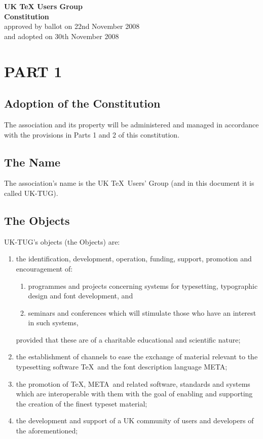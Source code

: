 \documentclass[a4paper,11pt]{article}
\newcommand{\MF}{{\manual META}\-{\manual FONT}}
\begin{document}
\begin{center}
\textbf{\Large{UK {\TeX} Users Group}} \\[3ex]
\textbf{Constitution} \\[2ex]
approved by ballot on 22nd November 2008 \\
and adopted on 30th November 2008
\end{center}
 
\vspace{2ex}
\section*{PART 1}

\subsection{Adoption of the Constitution}

The association and its property will be administered and managed in accordance
with the provisions in Parts 1 and 2 of this constitution.

\subsection{The Name}

The association's name is the UK \TeX\ Users' Group (and in this document it
is called UK-TUG).

\subsection{The Objects}

UK-TUG's objects (the Objects) are:
\begin{enumerate}
\item the identification, development, operation, funding, support, promotion
  and encouragement of:
  \begin{enumerate}
  \item programmes and projects concerning systems for typesetting, typographic
   design and font development, and
  \item seminars and conferences which will stimulate those who have an 
   interest in such systems,
  \end{enumerate}
  provided that these are of a charitable educational and scientific nature;
\item the establishment of channels to ease the exchange of material relevant to
  the typesetting software \TeX\ and the font description language \MF;
\item the promotion of \TeX, \MF\ and related software, standards and systems
  which are interoperable with them with the goal of enabling and supporting the
  creation of the finest typeset material;
\item the development and support of a UK community of users and developers of
  the aforementioned;
\end{enumerate}
\end{document}
